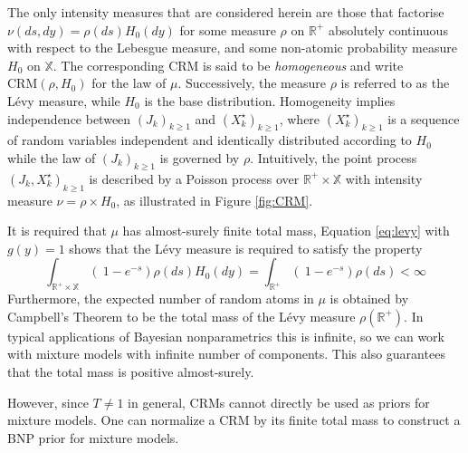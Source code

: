 The only intensity measures that are considered herein are those that factorise $\nu(ds, dy) = \rho(ds)H_0(dy)$ for some measure $\rho$ on $\mathbb{R}^+$ absolutely continuous with respect to the Lebesgue measure, and some non-atomic probability measure $H_0$ on $\mathbb{X}$. The corresponding \gls{CRM} is said to be \textit{homogeneous} and write $\text{CRM}(\rho, H_0)$ for the law of $\mu$. Successively, the measure $\rho$ is referred to as the Lévy measure, while $H_0$ is the base distribution.
Homogeneity implies independence between $\left(J_k \right)_{k\ge1}$ and $\left(X^\star_k \right)_{k\ge1}$, where $\left(X^\star_k \right)_{k\ge1}$ is a sequence of random variables independent and identically distributed according to $H_0$ while the law of $\left(J_k \right)_{k\ge1}$  is governed by $\rho$. Intuitively, the point process $\left(J_k, X^\star_k \right)_{k\ge1}$  is described by a Poisson process over $\mathbb{R}^+ \times \mathbb{X}$ with intensity measure $\nu = \rho \times H_0$, as illustrated in Figure \ref{fig:CRM}.


It is required that $\mu$ has almost-surely finite total mass, Equation \ref{eq:levy} with $g(y)=1$ shows that the Lévy measure is required to satisfy the property
$$ \int_{\mathbb{R}^+ \times \mathbb{X}} \left( \  1 - e^{-s} \right) \rho(ds) H_0(dy) = 
\int_{\mathbb{R}^+} \left( \  1 - e^{-s} \right) \rho(ds) < \infty $$
Furthermore, the expected number of random atoms in $\mu$ is obtained by Campbell’s Theorem to be the total mass of the Lévy measure $\rho(\mathbb{R}^+)$. In typical applications of Bayesian nonparametrics this is infinite, so we can work with mixture models with infinite number of components. This also guarantees that the total mass is positive almost-surely. 

However, since $T \neq 1$ in general, \glspl{CRM} cannot directly be used as priors for mixture models.
One can normalize a \gls{CRM} by its finite total mass to construct a BNP prior for mixture models.\\

